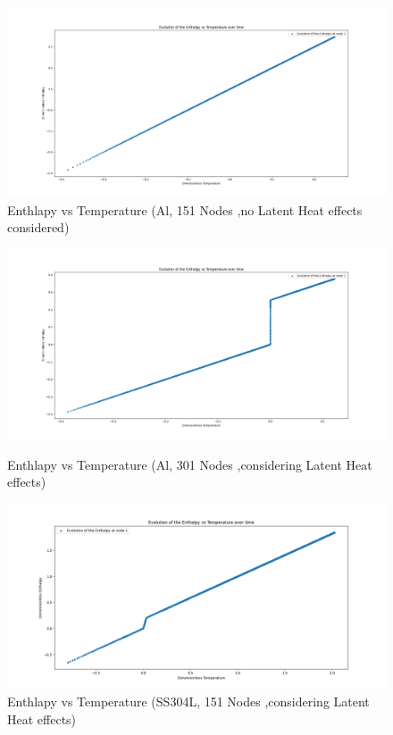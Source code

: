 \begin{figure}[h]
  \centering
  \includegraphics[width=15cm]{img/Evolution_of_Enthalpy_at_node_2_Crystalline_materials_no_latent_heat.png}
  \caption{Enthlapy vs Temperature (Al, 151 Nodes ,no Latent Heat effects considered)}
  \label{fig:AL_Enthalpy_Temperature}
\end{figure}

\begin{figure}[h]
  \centering
  \includegraphics[width=15cm]{img/Temperature_vs_enthalpy_with_latent_heat_crystalline.png}
  \caption{Enthlapy vs Temperature (Al, 301 Nodes ,considering Latent Heat effects)}
  \label{fig:AL_Enthalpy_Temperature_Latent_Heat}
  
  \centering
  \includegraphics[width=15cm]{img/H_Tfor_amorphous.png}
  \caption{Enthlapy vs Temperature (SS304L, 151 Nodes ,considering Latent Heat effects)}
  \label{fig:SS304L_Enthalpy_Temperature_Latent_Heat}
  
\end{figure}

